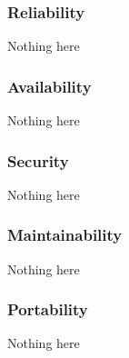 \subsubsection{Reliability}
Nothing here

\subsubsection{Availability}
Nothing here

\subsubsection{Security}
Nothing here

\subsubsection{Maintainability}
Nothing here

\subsubsection{Portability}
Nothing here
